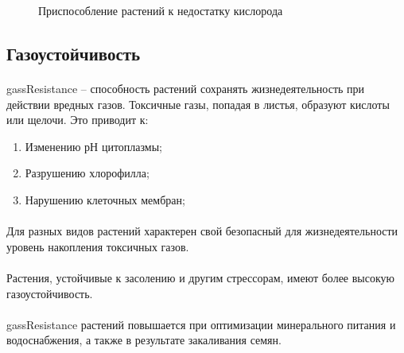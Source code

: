 \begin{figure}[h]
\begin{minipage}[h]{0.49\linewidth}
\end{minipage}
\caption{Приспособление растений к недостатку кислорода}
\label{anti_gipoxia}
\end{figure}


\subsection*{Газоустойчивость}

\paragraph*{}\gls{gassResistance} -- способность растений сохранять жизнедеятельность при действии вредных газов. Токсичные газы, попадая в листья, образуют кислоты или щелочи. Это приводит к: 

\begin{enumerate}
	\item Изменению рН цитоплазмы;
	\item Разрушению хлорофилла;
	\item Нарушению клеточных мембран;
\end{enumerate}

\paragraph*{}Для разных видов растений характерен свой безопасный для жизнедеятельности уровень накопления токсичных газов. 


\paragraph*{}Растения, устойчивые к засолению и другим стрессорам, имеют более высокую газоустойчивость.

\paragraph*{}\gls{gassResistance} растений повышается при оптимизации минерального питания и водоснабжения, а также в результате закаливания семян. 

